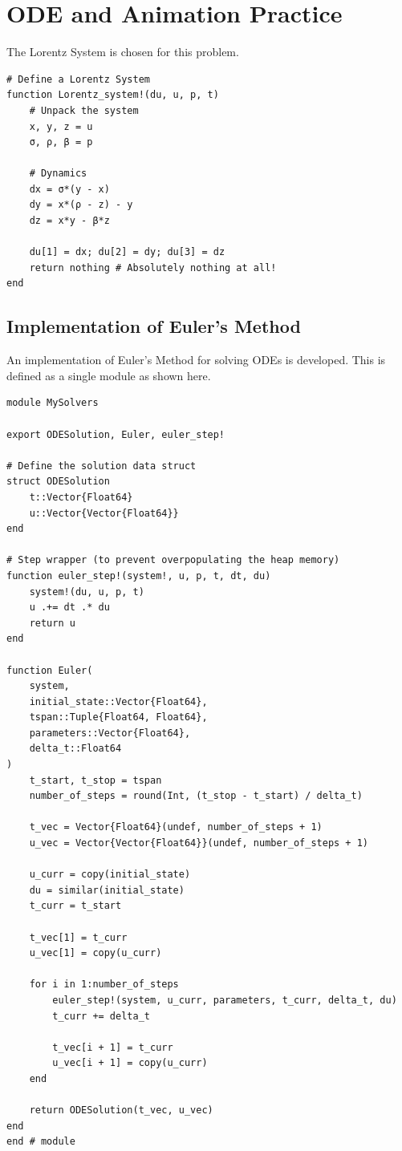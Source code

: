 \section{ODE and Animation Practice}

The Lorentz System is chosen for this problem.

\begin{verbatim}
# Define a Lorentz System
function Lorentz_system!(du, u, p, t)
    # Unpack the system
    x, y, z = u
    σ, ρ, β = p

    # Dynamics
    dx = σ*(y - x)
    dy = x*(ρ - z) - y
    dz = x*y - β*z

    du[1] = dx; du[2] = dy; du[3] = dz
    return nothing # Absolutely nothing at all!
end
\end{verbatim}

\subsection{Implementation of Euler's Method}
An implementation of Euler's Method for solving ODEs is developed. This is defined as a single module as shown here.

\begin{verbatim}
module MySolvers

export ODESolution, Euler, euler_step!

# Define the solution data struct
struct ODESolution
    t::Vector{Float64}
    u::Vector{Vector{Float64}}
end

# Step wrapper (to prevent overpopulating the heap memory)
function euler_step!(system!, u, p, t, dt, du)
    system!(du, u, p, t)
    u .+= dt .* du
    return u
end

function Euler(
    system,
    initial_state::Vector{Float64},
    tspan::Tuple{Float64, Float64},
    parameters::Vector{Float64},
    delta_t::Float64
)
    t_start, t_stop = tspan
    number_of_steps = round(Int, (t_stop - t_start) / delta_t)

    t_vec = Vector{Float64}(undef, number_of_steps + 1)
    u_vec = Vector{Vector{Float64}}(undef, number_of_steps + 1)

    u_curr = copy(initial_state)
    du = similar(initial_state)
    t_curr = t_start

    t_vec[1] = t_curr
    u_vec[1] = copy(u_curr)

    for i in 1:number_of_steps
        euler_step!(system, u_curr, parameters, t_curr, delta_t, du)
        t_curr += delta_t

        t_vec[i + 1] = t_curr
        u_vec[i + 1] = copy(u_curr)
    end

    return ODESolution(t_vec, u_vec)
end
end # module
\end{verbatim}

